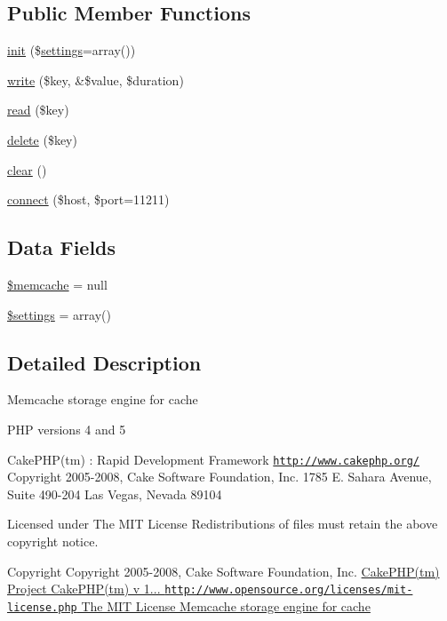 \subsection*{Public Member Functions}
\begin{DoxyCompactItemize}
\item 
\hyperlink{class_cache_memcache_add47463221d657541f10f2ca5ec218d8}{init} (\$\hyperlink{class_cache_engine_ad7354383714c6ae99d6ee1bfb95ab49f}{settings}=array())
\item 
\hyperlink{class_cache_memcache_a0e72b4e1d3c5ff461155883cad18358d}{write} (\$key, \&\$value, \$duration)
\item 
\hyperlink{class_cache_memcache_a4c50c958c469c08bba0c0ccb710ca8af}{read} (\$key)
\item 
\hyperlink{class_cache_memcache_aa74a2edd6f3cbb5c5353f7faa97b6d70}{delete} (\$key)
\item 
\hyperlink{class_cache_memcache_aa821bec12eaa7e0f649397c9675ff505}{clear} ()
\item 
\hyperlink{class_cache_memcache_addde359a43219d7665c8d7677fbbab31}{connect} (\$host, \$port=11211)
\end{DoxyCompactItemize}
\subsection*{Data Fields}
\begin{DoxyCompactItemize}
\item 
\hyperlink{class_cache_memcache_ae7b98d2059d138bf69a5b67c3426d01a}{\$memcache} = null
\item 
\hyperlink{class_cache_memcache_ac7c3353107070daa85f641882931b358}{\$settings} = array()
\end{DoxyCompactItemize}


\subsection{Detailed Description}
Memcache storage engine for cache

P\-H\-P versions 4 and 5

Cake\-P\-H\-P(tm) \-: Rapid Development Framework \href{http://www.cakephp.org/}{\tt http\-://www.\-cakephp.\-org/} Copyright 2005-\/2008, Cake Software Foundation, Inc. 1785 E. Sahara Avenue, Suite 490-\/204 Las Vegas, Nevada 89104

Licensed under The M\-I\-T License Redistributions of files must retain the above copyright notice.

\begin{DoxyCopyright}{Copyright}
Copyright 2005-\/2008, Cake Software Foundation, Inc. \hyperlink{}{Cake\-P\-H\-P(tm) Project  Cake\-P\-H\-P(tm) v 1...        \href{http://www.opensource.org/licenses/mit-license.php}{\tt http\-://www.\-opensource.\-org/licenses/mit-\/license.\-php} The M\-I\-T License Memcache storage engine for cache }
\end{DoxyCopyright}


